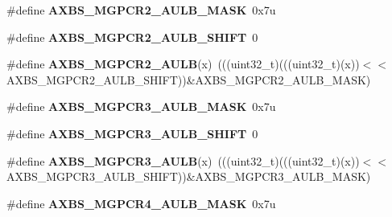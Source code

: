 \begin{DoxyCompactItemize}
\item 
\#define {\bfseries A\+X\+B\+S\+\_\+\+M\+G\+P\+C\+R2\+\_\+\+A\+U\+L\+B\+\_\+\+M\+A\+SK}~0x7u\hypertarget{group__AXBS__Register__Masks_ga454fa34b9ad3a689e961506a253e3775}{}\label{group__AXBS__Register__Masks_ga454fa34b9ad3a689e961506a253e3775}

\item 
\#define {\bfseries A\+X\+B\+S\+\_\+\+M\+G\+P\+C\+R2\+\_\+\+A\+U\+L\+B\+\_\+\+S\+H\+I\+FT}~0\hypertarget{group__AXBS__Register__Masks_ga0e4aa4214fd104e88a02473e0bf30c7f}{}\label{group__AXBS__Register__Masks_ga0e4aa4214fd104e88a02473e0bf30c7f}

\item 
\#define {\bfseries A\+X\+B\+S\+\_\+\+M\+G\+P\+C\+R2\+\_\+\+A\+U\+LB}(x)~(((uint32\+\_\+t)(((uint32\+\_\+t)(x))$<$$<$A\+X\+B\+S\+\_\+\+M\+G\+P\+C\+R2\+\_\+\+A\+U\+L\+B\+\_\+\+S\+H\+I\+FT))\&A\+X\+B\+S\+\_\+\+M\+G\+P\+C\+R2\+\_\+\+A\+U\+L\+B\+\_\+\+M\+A\+SK)\hypertarget{group__AXBS__Register__Masks_ga9047bce6c6e5493c18263bab8fc48b34}{}\label{group__AXBS__Register__Masks_ga9047bce6c6e5493c18263bab8fc48b34}

\item 
\#define {\bfseries A\+X\+B\+S\+\_\+\+M\+G\+P\+C\+R3\+\_\+\+A\+U\+L\+B\+\_\+\+M\+A\+SK}~0x7u\hypertarget{group__AXBS__Register__Masks_ga32728cb5c7a9e5bb1d40e3ae1842fa33}{}\label{group__AXBS__Register__Masks_ga32728cb5c7a9e5bb1d40e3ae1842fa33}

\item 
\#define {\bfseries A\+X\+B\+S\+\_\+\+M\+G\+P\+C\+R3\+\_\+\+A\+U\+L\+B\+\_\+\+S\+H\+I\+FT}~0\hypertarget{group__AXBS__Register__Masks_gad9320811473f8962f040b6f8bb2b2bf8}{}\label{group__AXBS__Register__Masks_gad9320811473f8962f040b6f8bb2b2bf8}

\item 
\#define {\bfseries A\+X\+B\+S\+\_\+\+M\+G\+P\+C\+R3\+\_\+\+A\+U\+LB}(x)~(((uint32\+\_\+t)(((uint32\+\_\+t)(x))$<$$<$A\+X\+B\+S\+\_\+\+M\+G\+P\+C\+R3\+\_\+\+A\+U\+L\+B\+\_\+\+S\+H\+I\+FT))\&A\+X\+B\+S\+\_\+\+M\+G\+P\+C\+R3\+\_\+\+A\+U\+L\+B\+\_\+\+M\+A\+SK)\hypertarget{group__AXBS__Register__Masks_gaa1a9d435c8f13c30b3d781dd19a71ec6}{}\label{group__AXBS__Register__Masks_gaa1a9d435c8f13c30b3d781dd19a71ec6}

\item 
\#define {\bfseries A\+X\+B\+S\+\_\+\+M\+G\+P\+C\+R4\+\_\+\+A\+U\+L\+B\+\_\+\+M\+A\+SK}~0x7u\hypertarget{group__AXBS__Register__Masks_ga0e8cb920fbcfaaefe210dedc102129d1}{}\label{group__AXBS__Register__Masks_ga0e8cb920fbcfaaefe210dedc102129d1}


\end{DoxyCompactItemize}
